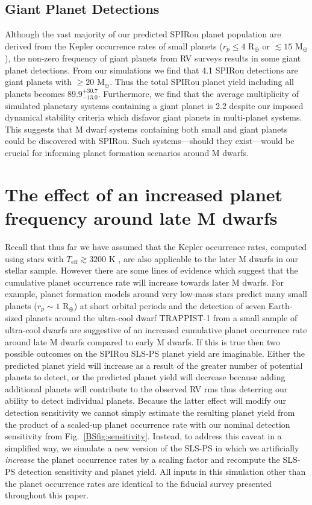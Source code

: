 \subsection{Giant Planet Detections}
Although the vast majority of our predicted SPIRou planet population are derived from the Kepler occurrence
rates of small planets ($r_p \leq 4$ R$_{\oplus}$ or \msini{} $\lesssim 15$ M$_{\oplus}$), the non-zero frequency
of giant planets from RV surveys results in some giant planet detections. From our simulations we find that
4.1 SPIRou detections are giant planets with \msini{} $\geq 20$ M$_{\oplus}$. Thus the total SPIRou planet yield
including all planets becomes $89.9^{+30.7}_{-13.0}$. Furthermore, we find
that the average multiplicity of simulated planetary systems containing a giant planet is 2.2 despite our
imposed dynamical stability criteria which disfavor giant planets in multi-planet systems. This suggests that
M dwarf systems containing both small and giant planets could be discovered with SPIRou. Such systems---should
they exist---would be crucial for informing planet formation scenarios around M dwarfs. 


\section{The effect of an increased planet frequency around late M dwarfs} \label{BSsect:2occ}
Recall that thus far we have assumed that the Kepler occurrence rates,
computed using stars with $T_{\text{eff}} \gtrsim 3200$ K \citep[i.e. spectral
  types of M4.5 and earlier;][]{luhman03}, are also applicable to the later
M dwarfs in our stellar sample. However there are some lines of evidence which
suggest that the cumulative planet occurrence rate will increase towards later M dwarfs.
For example, planet formation models around very
low-mass stars predict many small planets ($r_p \sim 1$ R$_{\oplus}$) at short
orbital periods \citep[e.g.][]{alibert13,alibert17} and the detection of seven
Earth-sized planets around the ultra-cool dwarf TRAPPIST-1 from a small sample
of ultra-cool dwarfs \citep{gillon17, luger17} are suggestive of an increased
cumulative planet occurrence rate around late M dwarfs compared to early
M dwarfs. If this is true then two possible outcomes on the SPIRou SLS-PS
planet yield are imaginable. Either the predicted planet yield will increase as a
result of the greater number of potential planets to detect, or the predicted
planet yield will decrease because adding additional planets will contribute to the
observed RV rms thus deterring our ability to detect individual planets.
Because the latter effect will modify our detection sensitivity we cannot simply estimate the
resulting planet yield from the product of a scaled-up planet occurrence rate with our nominal
detection sensitivity from Fig.~\ref{BSfig:sensitivity}. Instead, to address this
caveat in a simplified way, we simulate a new version of the SLS-PS 
in which we artificially \emph{increase} the planet occurrence rates by a scaling factor
and recompute the SLS-PS detection sensitivity and planet yield.
All inputs in this simulation other than the planet occurrence
rates are identical to the fiducial survey presented throughout this paper.  \\

